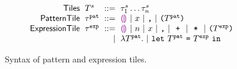 \begin{figure}
  \vspace{-3px}
  \[
  \arraycolsep=3pt\begin{array}{rlrl}
      \mathsf{Tiles} & \tiles^s & ::= & \tile^s_1\dots\tile^s_n \\
      \mathsf{PatternTile} & \tile^{\pat} & ::= &
        \shole ~\vert~
        \svar{x} ~\vert~
        \sprod{}{} ~\vert~
        \sparen{\tiles^{\pat}}\\
      \mathsf{ExpressionTile} & \tile^{\expr} & ::= &
        \shole ~\vert~
        \snumlit{n} ~\vert~
        \svar{x} ~\vert~
        \sprod{}{} ~\vert~
        \splus{}{} ~\vert~
        \smult{}{} ~\vert~
        \sparen{\tiles^{\expr}} \\
      & & \vert &
        \slam{\tiles^{\pat}}{} ~\vert~
        \slet{\tiles^{\pat}}{\tiles^{\expr}}{} %
  \end{array}\]
  \caption{
    Syntax of pattern and expression tiles. 
  }
  \label{fig:tile-syntax}
\end{figure}
